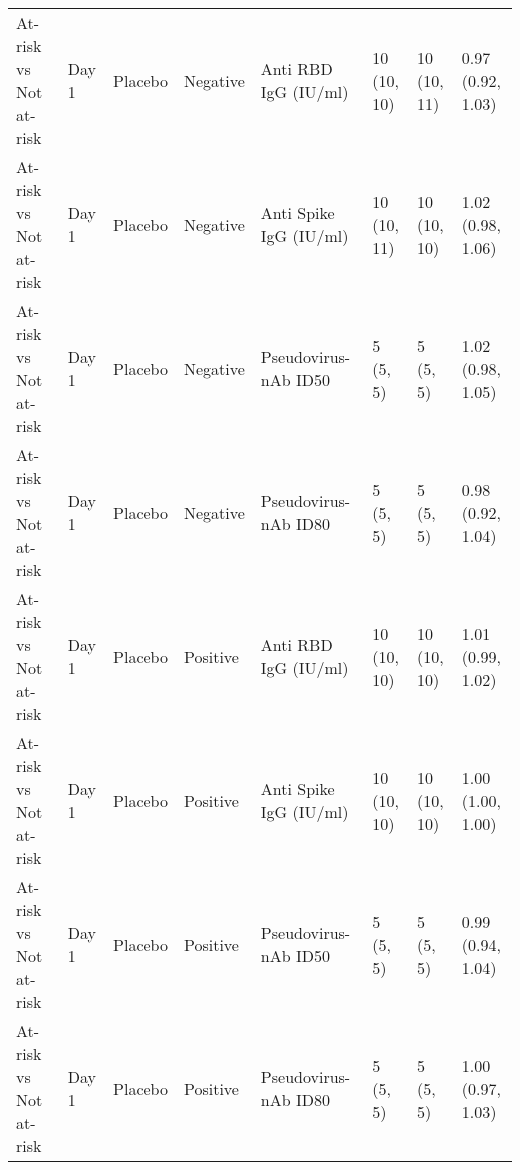\documentclass[]{book}
\theoremstyle{definition}
\theoremstyle{definition}
\theoremstyle{definition}
\newcommand{\1}{\mathbbm{1}}
\begin{document}
\begin{landscape}
\begin{ThreePartTable}
\begin{longtable}[t]{>{\raggedright\arraybackslash}p{2.7cm}lllllll}
At-risk vs Not at-risk & Day 1 & Placebo & Negative & Anti RBD IgG (IU/ml) & \makecell[l]{10\\(10, 10)} & \makecell[l]{10\\(10, 11)} & \makecell[l]{0.97\\(0.92, 1.03)}\\
At-risk vs Not at-risk & Day 1 & Placebo & Negative & Anti Spike IgG (IU/ml) & \makecell[l]{10\\(10, 11)} & \makecell[l]{10\\(10, 10)} & \makecell[l]{1.02\\(0.98, 1.06)}\\
At-risk vs Not at-risk & Day 1 & Placebo & Negative & Pseudovirus-nAb ID50 & \makecell[l]{5\\(5, 5)} & \makecell[l]{5\\(5, 5)} & \makecell[l]{1.02\\(0.98, 1.05)}\\
At-risk vs Not at-risk & Day 1 & Placebo & Negative & Pseudovirus-nAb ID80 & \makecell[l]{5\\(5, 5)} & \makecell[l]{5\\(5, 5)} & \makecell[l]{0.98\\(0.92, 1.04)}\\
\addlinespace
At-risk vs Not at-risk & Day 1 & Placebo & Positive & Anti RBD IgG (IU/ml) & \makecell[l]{10\\(10, 10)} & \makecell[l]{10\\(10, 10)} & \makecell[l]{1.01\\(0.99, 1.02)}\\
At-risk vs Not at-risk & Day 1 & Placebo & Positive & Anti Spike IgG (IU/ml) & \makecell[l]{10\\(10, 10)} & \makecell[l]{10\\(10, 10)} & \makecell[l]{1.00\\(1.00, 1.00)}\\
At-risk vs Not at-risk & Day 1 & Placebo & Positive & Pseudovirus-nAb ID50 & \makecell[l]{5\\(5, 5)} & \makecell[l]{5\\(5, 5)} & \makecell[l]{0.99\\(0.94, 1.04)}\\
At-risk vs Not at-risk & Day 1 & Placebo & Positive & Pseudovirus-nAb ID80 & \makecell[l]{5\\(5, 5)} & \makecell[l]{5\\(5, 5)} & \makecell[l]{1.00\\(0.97, 1.03)}\\

\end{longtable}
\end{ThreePartTable}
\end{landscape}
\end{document}
